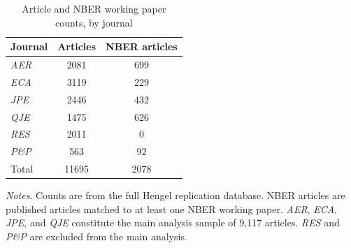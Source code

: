\begin{table}[H]
    \footnotesize
    \centering
    \begin{threeparttable}
        \caption{Article and NBER working paper counts, by journal}
        \label{table-s1}
        \begin{tabular}{lSS}
            \toprule
            {Journal} & {Articles} & {NBER articles} \\
            \midrule
        \textit{AER}     &  2081 &   699 \\
        \textit{ECA}     &  3119 &   229 \\
        \textit{JPE}     &  2446 &   432 \\
        \textit{QJE}     &  1475 &   626 \\
        \textit{RES}     &  2011 &     0 \\
        \textit{P\&P}    &   563 &    92 \\
            \midrule
        Total            & 11695 &  2078 \\
            \bottomrule
        \end{tabular}
        \begin{tablenotes}
            \tiny
            \item \textit{Notes}. Counts are from the full Hengel replication database.
            NBER articles are published articles matched to at least one NBER working paper.
            \textit{AER}, \textit{ECA}, \textit{JPE}, and \textit{QJE} constitute
            the main analysis sample of 9,117 articles.
            \textit{RES} and \textit{P\&P} are excluded from the main analysis.
        \end{tablenotes}
    \end{threeparttable}
\end{table}

